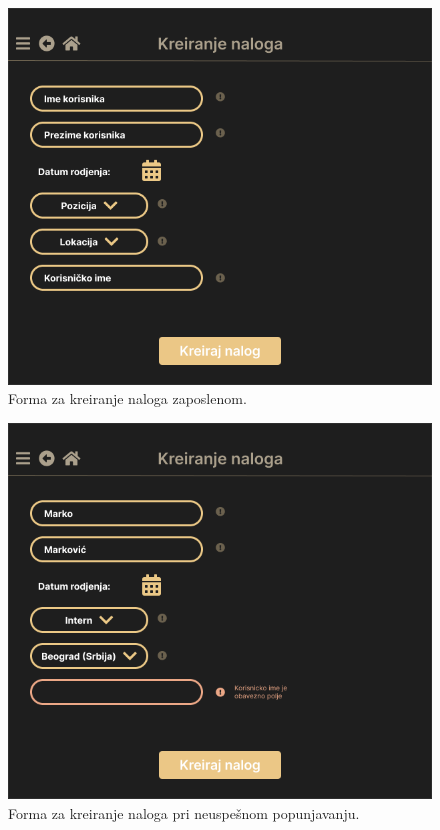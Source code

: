 \documentclass[a4paper]{article}
\begin{document}
\begin{figure} [!ht]
    \begin{center}
        \includegraphics[scale=0.33]{UI/Administrator/Administrator_KreiranjeNaloga_Forma.png}
    \end{center}
\caption{Forma za kreiranje naloga zaposlenom.}
\end{figure}

\begin{figure} [!ht]
    \begin{center}
        \includegraphics[scale=0.33]{UI/Administrator/Administrator_KreiranjeNaloga_ObaveznoPolje.png}
    \end{center}
\caption{Forma za kreiranje naloga pri neuspešnom popunjavanju.}
\end{figure}
\end{document}
